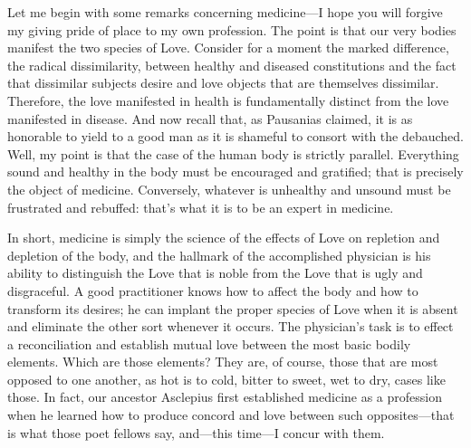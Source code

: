 Let me begin with some remarks concerning medicine---I hope you will
forgive my giving pride of place to my own profession. The point is that
our very bodies manifest the two species of Love. Consider for a moment
the marked difference, the radical dissimilarity, between healthy and
diseased constitutions and the fact that dissimilar subjects desire and
love objects that are themselves dissimilar. Therefore, the love
manifested in health is fundamentally distinct from the love manifested
in disease. And  now recall that, as Pausanias claimed, it is as
honorable to yield to a good man as it is shameful to consort with the
debauched. Well, my point is that the case of the human body is strictly
parallel. Everything sound and healthy in the body must be encouraged
and gratified; that is precisely the object of medicine. Conversely,
whatever is unhealthy and unsound must be frustrated and rebuffed:
that's what it is to be an expert in medicine.

 In short, medicine is simply the science of the effects of Love
on repletion and depletion of the body, and the hallmark of the
accomplished physician is his ability to distinguish the Love that is
noble from the Love that is ugly and disgraceful. A good practitioner
knows how to affect the body and how to transform its desires; he can
implant the proper species of Love when it is absent and eliminate the
other sort whenever it occurs. The physician's task is to effect a
reconciliation and establish mutual love between the most basic bodily
elements. Which are those elements? They are, of course, those that are
most opposed to one another, as hot is to  cold, bitter to sweet,
wet to dry, cases like those. In fact, our ancestor Asclepius first
established medicine as a profession when he learned how to produce
concord and love between such opposites---that is what those poet
fellows say, and---this time---I concur with them.

